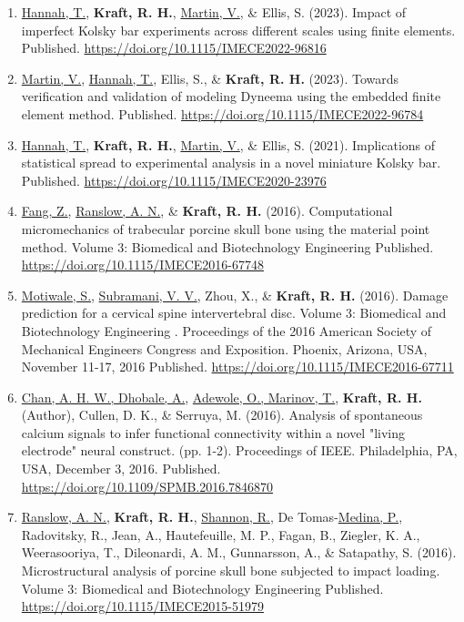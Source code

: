 \documentclass[a4paper,10pt]{article}
\begin{document}
    \begin{enumerate}
      \item \underline{Hannah, T.}, \textbf{\textbf{Kraft,} R. H.}, \underline{Martin, V.}, \&
 Ellis, S. (2023). Impact of imperfect Kolsky bar experiments across different scales using finite elements. Published. \url{https://doi.org/10.1115/IMECE2022-96816}
  \item \underline{Martin, V.}, \underline{Hannah, T.}, Ellis, S., \&
 \textbf{\textbf{Kraft,} R. H.} (2023). Towards verification and validation of modeling Dyneema using the embedded finite element method. Published. \url{https://doi.org/10.1115/IMECE2022-96784}
  \item \underline{Hannah, T.}, \textbf{\textbf{Kraft,} R. H.}, \underline{Martin, V.}, \&
 Ellis, S. (2021). Implications of statistical spread to experimental analysis in a novel miniature Kolsky bar. Published. \url{https://doi.org/10.1115/IMECE2020-23976}
  \item \underline{Fang, Z.}, \underline{Ranslow, A. N.}, \&
 \textbf{\textbf{Kraft,} R. H.} (2016). Computational micromechanics of trabecular porcine skull bone using the material point method. Volume 3: Biomedical and Biotechnology Engineering Published. \url{https://doi.org/10.1115/IMECE2016-67748}
  \item \underline{Motiwale, S.}, \underline{Subramani, V. V.}, Zhou, X., \&
 \textbf{\textbf{Kraft,} R. H.} (2016). Damage prediction for a cervical spine intervertebral disc. Volume 3: Biomedical and Biotechnology Engineering . Proceedings of the 2016 American Society of Mechanical Engineers Congress and Exposition.  
Phoenix, Arizona, USA, November 11-17, 2016 Published. \url{https://doi.org/10.1115/IMECE2016-67711}
  \item \underline{Chan, A. H. W., Dhobale, A.}, \underline{Adewole, O., Marinov, T.}, \textbf{\textbf{Kraft,} R. H.} (Author), Cullen, D. K., \&
 Serruya, M. (2016). Analysis of spontaneous calcium signals to infer functional connectivity within a novel "living electrode" neural construct. (pp. 1-2). Proceedings of IEEE.  
Philadelphia, PA, USA, December 3, 2016. Published. \url{https://doi.org/10.1109/SPMB.2016.7846870}
  \item \underline{Ranslow, A. N.}, \textbf{\textbf{Kraft,} R. H.}, \underline{Shannon, R.}, De Tomas-\underline{Medina, P.}, Radovitsky, R., Jean, A., Hautefeuille, M. P., Fagan, B., Ziegler, K. A., Weerasooriya, T., Dileonardi, A. M., Gunnarsson, A., \&
 Satapathy, S. (2016). Microstructural analysis of porcine skull bone subjected to impact loading. Volume 3: Biomedical and Biotechnology Engineering Published. \url{https://doi.org/10.1115/IMECE2015-51979}

\end{enumerate}
\end{document}

